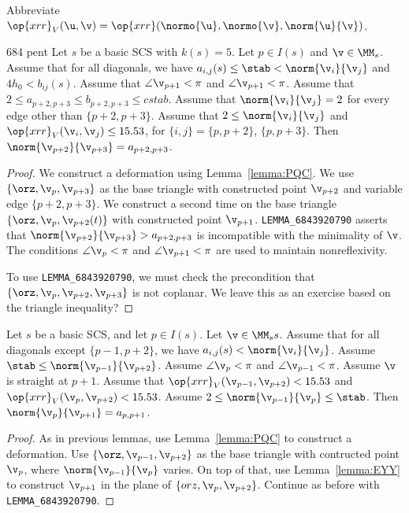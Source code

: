 Abbreviate $\op{xrr}_V (\u,\v) = \op{xrr} (\normo{\u},\normo{\v},\norm{\u}{\v})$.

\begin{lemma}{684 pent}\label{lemma:684-pent}
Let $s$ be a basic SCS with $k(s)=5$.  Let $p\in I(s)$ and $\v\in \MM_s$.
Assume that for all diagonals, we have $a_{i,j}(s) \le \stab <\norm{\v_i}{\v_j}$ and $4h_0 < b_{ij}(s)$.
Assume that $\angle \v_{p+1} < \pi$ and $\angle \v_{p+1} < \pi$.
Assume that $2\le a_{p+2,p+3} \le b_{p+2,p+3} \le cstab$.
Assume that $\norm{\v_i}{\v_j}=2$ for every edge other than $\{p+2,p+3\}$.
Assume that $2\le \norm{\v_i}{\v_j}$ and $\op{xrr}_V(\v_i,\v_j)\le 15.53$, for $\{i,j\} = \{p,p+2\}$, $\{p,p+3\}$.
Then $\norm{\v_{p+2}}{\v_{p+3}} = a_{p+2,p+3}$.
\end{lemma}

\begin{proof} We construct a deformation using Lemma~\ref{lemma:PQC}.  We use $\{\orz,\v_p,\v_{p+3}\}$ as
the base triangle with constructed point $\v_{p+2}$ and variable edge $\{p+2,p+3\}$.  We construct a second
time on the base triangle $\{\orz,\v_p,\v_{p+2}(t)\}$ with constructed point $\v_{p+1}$.
{\tt LEMMA\_6843920790} asserts that $\norm{\v_{p+2}}{\v_{p+3}} > a_{p+2,p+3}$ is incompatible with the minimality of $\v$.
The conditions  $\angle \v_p < \pi$ and $\angle \v_{p+1} < \pi$ are used to maintain nonreflexivity.

To use {\tt LEMMA\_6843920790}, we must check the precondition that $\{\orz,\v_p,\v_{p+2},\v_{p+3}\}$
is not coplanar.  We leave this as an exercise based on the triangle inequality?
\end{proof}

\begin{lemma}[684 str]\label{lemma:684 str}
Let $s$ be a basic SCS, and let $p\in I(s)$.  Let $\v\in \MM_ss$.
Assume that for all diagonals except $\{p-1,p+2\}$,
we have $a_{i,j}(s)<\norm{\v_i}{\v_j}$.  
Assume $\stab \le \norm{\v_{p-1}}{\v_{p+2}}$.
Assume $\angle \v_p < \pi$ and $\angle \v_{p-1} < \pi$.
Assume $\v$ is straight at $p+1$.
Assume that $\op{xrr}_V(\v_{p-1},\v_{p+2})<15.53$ and $\op{xrr}_V(\v_p,\v_{p+2})< 15.53$.
Assume $2\le  \norm{\v_{p-1}}{\v_{p}}\le \stab$.
Then $\norm{\v_p}{\v_{p+1}} = a_{p,p+1}$.
\end{lemma}

\begin{proof} As in previous lemmas, use Lemma~\ref{lemma:PQC} to construct a deformation.
Use $\{\orz,\v_{p-1},\v_{p+2}\}$ as the base triangle with contructed point $\v_p$, where $\norm{\v_{p-1}}{\v_p}$ varies.
On top of that, use Lemma~\ref{lemma:EYY} to construct $\v_{p+1}$ in the plane of $\{orz,\v_p,\v_{p+2}\}$.
Continue as before with  {\tt LEMMA\_6843920790}.
\end{proof}

